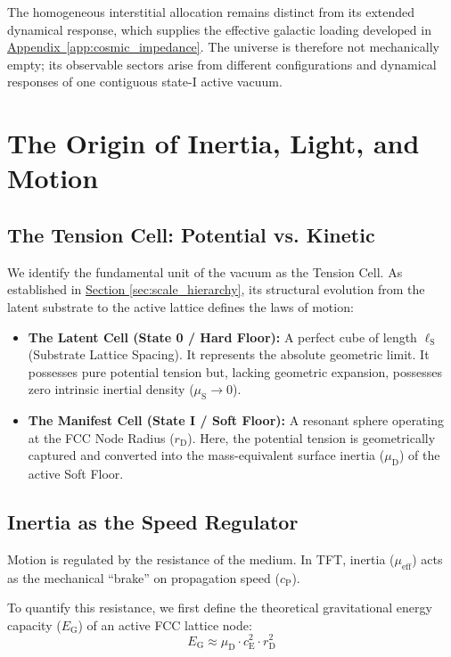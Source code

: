 The homogeneous interstitial allocation remains distinct from its extended dynamical response, which supplies the effective galactic loading developed in \hyperref[app:cosmic_impedance]{Appendix~\ref*{app:cosmic_impedance}}. The universe is therefore not mechanically empty; its observable sectors arise from different configurations and dynamical responses of one contiguous state-I active vacuum.

\chapter{The Origin of Inertia, Light, and Motion}
\label{chap:origin_inertia_light_motion}
\section{The Tension Cell: Potential vs. Kinetic}
We identify the fundamental unit of the vacuum as the Tension Cell. As established in \hyperref[sec:scale_hierarchy]{Section \ref*{sec:scale_hierarchy}}, its structural evolution from the latent substrate to the active lattice defines the laws of motion:
\begin{itemize}
    \item \textbf{The Latent Cell (State 0 / Hard Floor):} A perfect cube of length $\ell_{\mathrm{S}}$ (Substrate Lattice Spacing). It represents the absolute geometric limit. It possesses pure potential tension but, lacking geometric expansion, possesses zero intrinsic inertial density ($\mu_{\mathrm{S}} \to 0$).
    \item \textbf{The Manifest Cell (State I / Soft Floor):} A resonant sphere operating at the FCC Node Radius ($r_{\mathrm{D}}$). Here, the potential tension is geometrically captured and converted into the mass-equivalent surface inertia ($\mu_{\mathrm{D}}$) of the active Soft Floor.
\end{itemize}

\section{Inertia as the Speed Regulator}
Motion is regulated by the resistance of the medium. In TFT, inertia ($\mu_{\mathrm{eff}}$) acts as the mechanical ``brake'' on propagation speed ($c_{\mathrm{P}}$).

To quantify this resistance, we first define the theoretical gravitational energy capacity ($E_{\mathrm{G}}$) of an active FCC lattice node:
\begin{equation}
    E_{\mathrm{G}} \approx \mu_{\mathrm{D}} \cdot c_{\mathrm{E}}^2 \cdot r_{\mathrm{D}}^2
\end{equation}

